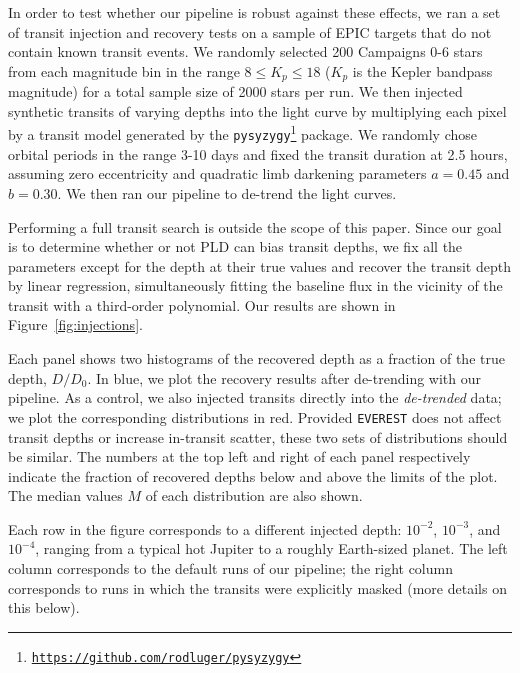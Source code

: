 \documentclass[]{emulateapj}
\begin{document}
In order to test whether our pipeline is robust against these effects, we ran a set
of transit injection and recovery tests on a sample of EPIC
targets that do not contain known transit events. We randomly selected 200 Campaigns 0-6 stars 
from each magnitude bin in the range $8 \le K_p \le 18$ ($K_p$ is the Kepler bandpass magnitude)
for a total sample size of 2000 stars per run. We then injected synthetic transits of varying depths into the
light curve by multiplying each pixel by a transit model generated by the 
\texttt{pysyzygy}\footnote{\texttt{\url{https://github.com/rodluger/pysyzygy}}}
package. We randomly chose orbital periods in the range 3-10 days and fixed
the transit duration at 2.5 hours, assuming zero eccentricity
and quadratic limb darkening parameters $a = 0.45$ and $b = 0.30$. We then
ran our pipeline to de-trend the light curves.

Performing a full transit search is outside the scope of this paper. Since our 
goal is to determine whether or not PLD can bias transit depths, we fix all the
parameters except for the depth at their true values and recover the transit
depth by linear regression, simultaneously fitting the baseline flux in the
vicinity of the transit with a third-order polynomial. Our results are shown
in Figure~\ref{fig:injections}.

Each panel shows two histograms of the recovered depth as a fraction of the true
depth, $D/D_0$. In blue, we plot the recovery results after de-trending with our pipeline.
As a control, we also injected transits directly into the \emph{de-trended} data; we 
plot the corresponding distributions in red. Provided \texttt{EVEREST} does not affect
transit depths or increase in-transit scatter, these two sets of distributions should 
be similar. The numbers at the top left and right of each
panel respectively indicate the fraction of recovered depths below and above the limits 
of the plot. The median values $M$ of each distribution are also shown.

Each row in the figure corresponds to a different injected depth: 
$10^{-2}$, $10^{-3}$, and $10^{-4}$, ranging from a typical 
hot Jupiter to a roughly Earth-sized planet. The left column corresponds to the default
runs of our pipeline; the right column corresponds to runs in which the transits were
explicitly masked (more details on this below).
\end{document}

